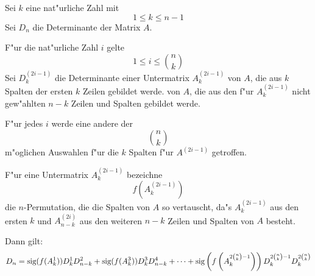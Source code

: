 \begin{satz}
\label{SatzLaplace}
    Sei $k$ eine nat"urliche Zahl mit
    \[ 1 \leq k \leq n-1 \] Sei $D_n$ die Determinante der Matrix $A$.

    F"ur die nat"urliche Zahl $i$ gelte \[ 1 \leq i \leq {n \choose k} \]
    Sei $D_k^{(2i-1)}$ die Determinante einer Untermatrix $A_k^{(2i-1)}$ von
    $A$, die aus $k$ Spalten der ersten $k$ Zeilen gebildet werde.
    von
    $A$, die aus den f"ur $A_k^{(2i-1)}$ nicht gew"ahlten $n-k$ Zeilen und
    Spalten gebildet werde.

    F"ur jedes $i$ werde eine andere der \[ {n \choose k} \] m"oglichen
    Auswahlen f"ur die $k$ Spalten f"ur $A^{(2i-1)}$ getroffen.

    F"ur eine Untermatrix $A_k^{(2i-1)}$ bezeichne \[ f(A_k^{(2i-1)}) \] die
    $n$-Permutation, die die Spalten von $A$ so vertauscht, da"s
    $A_k^{(2i-1)}$ aus den ersten $k$ und $A_{n-k}^{(2i)}$
    aus den weiteren $n-k$ Zeilen und Spalten von $A$ besteht.

    Dann gilt:
    \begin{equation}
    \label{EquSatzLaplace}
    D_n = \mbox{\rm sig}(f(A_k^1)) D_k^1 D_{n-k}^2 + \mbox{\rm sig}(f(A_k^3)) D_k^3 D_{n-k}^4
          + \cdots
          + \mbox{\rm sig} \left( f \left( A_k^{2{n \choose k}-1} \right) \right)
            D_k^{2{n \choose k}-1} D_k^{2{n \choose k}}
    \end{equation}
\end{satz}
